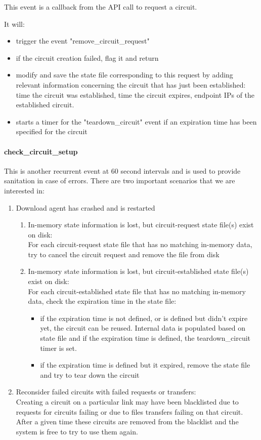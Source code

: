 This event is a callback from the API call to request a circuit.

It will:
\begin{itemize}
  \item trigger the event "remove\_circuit\_request"
  \item if the circuit creation failed, flag it and return
  \item modify and save the state file corresponding to this request by
adding relevant information concerning the circuit that has just been established:
time the circuit was established, time the circuit expires, endpoint IPs of 
the established circuit.
  \item starts a timer for the "teardown\_circuit" event if an expiration
time has been specified for the circuit
\end{itemize}

\paragraph{check\_circuit\_setup}

This is another recurrent event at 60 second intervals and is used to provide
sanitation in case of errors. There are two important scenarios that we are interested in:
\begin{enumerate}
  \item Download agent has crashed and is restarted
  \begin{enumerate}
    \item In-memory state information is lost, but circuit-request state file(s) exist on disk:\\
			For each circuit-request state file that has no matching in-memory data,
			try to cancel the circuit request and remove the file from disk
    \item In-memory state information is lost, but circuit-established state file(s) exist on disk:\\
			For each circuit-established state file that has no matching in-memory data,
			check the expiration time in the state file:
			\begin{itemize}
			  \item if the expiration time is not defined, or is defined but didn't expire yet,
					  the circuit can be reused. Internal data is populated based on state
					 file and if the expiration time is defined, the teardown\_circuit timer is
					 set.
			  \item if the expiration time is defined but it expired, remove the state file and
					 try to tear down the circuit 
			\end{itemize}
  \end{enumerate}
  \item Reconsider failed circuits with failed requests or transfers:\\
		  Creating a circuit on a particular link may have been blacklisted due to requests
		  for circuits failing or due to files transfers failing on that circuit. After a given
		  time these circuits are removed from the blacklist and the system is free to try
		  to use them again.
\end{enumerate}

